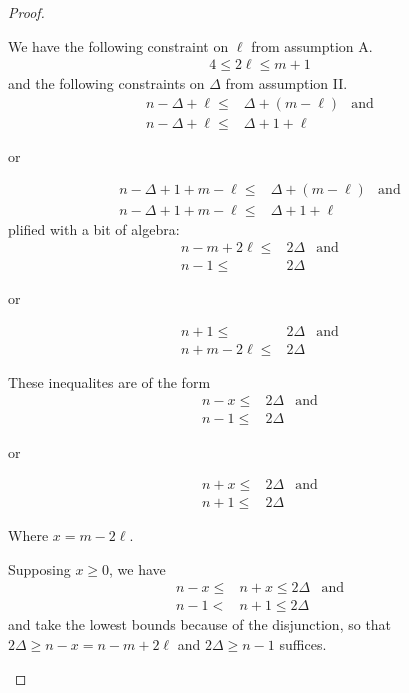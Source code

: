 \begin{proof}
\begin{proofpart}
  We have the following constraint on $\ell$ from
  assumption A.
  \begin{align*}
   4 \leq 2 \ell \leq m + 1
  \end{align*}
  and the following constraints on $\Delta$ from assumption II.
  \begin{align*}
   n - \Delta + \ell \leq & \Delta + (m - \ell) & \text{and} \\
   n - \Delta + \ell \leq & \Delta + 1 + \ell
  \end{align*}
  \begin{center}or\end{center}
  \begin{align*}
   n - \Delta + 1 + m - \ell \leq & \Delta + (m - \ell) & \text{and} \\
   n - \Delta + 1 + m - \ell \leq & \Delta + 1 + \ell
  \end{align*}
  plified with a bit of algebra:
  \begin{align*}
   n-m +2\ell \leq & 2 \Delta & \text{and} \\
   n-1 \leq        & 2\Delta
  \end{align*}
  \begin{center}or\end{center}
  \begin{align*}
   n + 1 \leq         & 2 \Delta & \text{and} \\
   n + m - 2\ell \leq & 2 \Delta
  \end{align*}

  These inequalites are of the form
  \begin{align*}
   n-x \leq & 2 \Delta & \text{and} \\
   n-1 \leq & 2\Delta
  \end{align*}
  \begin{center}or\end{center}
  \begin{align*}
   n + x \leq & 2 \Delta & \text{and} \\
   n + 1 \leq & 2 \Delta
  \end{align*}

  Where $x = m -2\ell$.

  Supposing $x\geq 0$, we have
  \begin{align*}
   n-x \leq & n+x \leq 2 \Delta & \text{and} \\
   n-1 < & n+1 \leq 2 \Delta
  \end{align*}
  and take the lowest bounds because of the disjunction, so that
   $2\Delta \geq n-x = n-m+2\ell$ and $2\Delta \geq n-1$ suffices.


\end{proofpart}
\end{proof}
